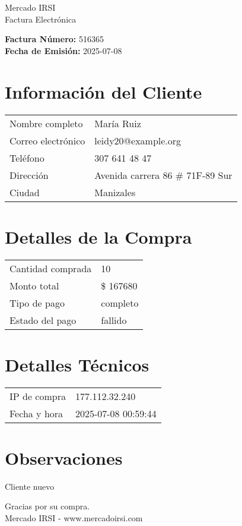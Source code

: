\documentclass[12pt]{article}
\begin{document}
\begin{center}
    \Huge Mercado IRSI \\
    \Large Factura Electrónica
\end{center}

\vspace{0.5cm}

\noindent \textbf{Factura Número:} 516365 \\
\textbf{Fecha de Emisión:} 2025-07-08

\vspace{0.5cm}

\section*{Información del Cliente}
\begin{longtable}{ll}
Nombre completo & María Ruiz \\
Correo electrónico & leidy20@example.org \\
Teléfono & 307 641 48 47 \\
Dirección & Avenida carrera 86 \# 71F-89 Sur \\
Ciudad & Manizales \\
\end{longtable}

\vspace{0.5cm}

\section*{Detalles de la Compra}
\begin{longtable}{ll}
Cantidad comprada & 10 \\
Monto total & \$ 167680 \\
Tipo de pago & completo \\
Estado del pago & fallido \\
\end{longtable}

\vspace{0.5cm}

\section*{Detalles Técnicos}
\begin{longtable}{ll}
IP de compra & 177.112.32.240 \\
Fecha y hora & 2025-07-08 00:59:44 \\
\end{longtable}

\vspace{0.5cm}

\section*{Observaciones}
Cliente nuevo

\vspace{0.5cm}

\begin{center}
    Gracias por su compra. \\
    Mercado IRSI - www.mercadoirsi.com
\end{center}
\end{document}
